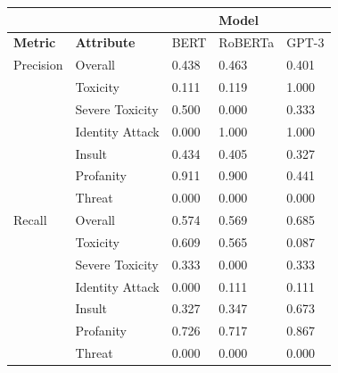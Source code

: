 \documentclass[11pt]{article}
\begin{document}
\begin{table}[h]
\centering
\begin{tabular}{lllll}
\hline
                                     &                                        &       & \textbf{Model}   &       \\ \hline
\multicolumn{1}{l|}{\textbf{Metric}} & \multicolumn{1}{l|}{\textbf{Attribute}} & BERT  & RoBERTa & GPT-3 \\ \hline
\multicolumn{1}{l|}{Precision}       & \multicolumn{1}{l|}{Overall}           & 0.438 & 0.463   & 0.401 \\ \cline{2-5} 
\multicolumn{1}{l|}{}                & \multicolumn{1}{l|}{Toxicity}          & 0.111 & 0.119   & 1.000 \\ \cline{2-5} 
\multicolumn{1}{l|}{}                & \multicolumn{1}{l|}{Severe Toxicity}   & 0.500 & 0.000   & 0.333 \\ \cline{2-5} 
\multicolumn{1}{l|}{}                & \multicolumn{1}{l|}{Identity Attack}   & 0.000 & 1.000   & 1.000 \\ \cline{2-5} 
\multicolumn{1}{l|}{}                & \multicolumn{1}{l|}{Insult}            & 0.434 & 0.405   & 0.327 \\ \cline{2-5} 
\multicolumn{1}{l|}{}                & \multicolumn{1}{l|}{Profanity}         & 0.911 & 0.900   & 0.441 \\ \cline{2-5} 
\multicolumn{1}{l|}{}                & \multicolumn{1}{l|}{Threat}            & 0.000 & 0.000   & 0.000 \\ \hline
\multicolumn{1}{l|}{Recall}          & \multicolumn{1}{l|}{Overall}           & 0.574 & 0.569   & 0.685 \\ \cline{2-5} 
\multicolumn{1}{l|}{}                & \multicolumn{1}{l|}{Toxicity}          & 0.609 & 0.565   & 0.087 \\ \cline{2-5} 
\multicolumn{1}{l|}{}                & \multicolumn{1}{l|}{Severe Toxicity}   & 0.333 & 0.000   & 0.333 \\ \cline{2-5} 
\multicolumn{1}{l|}{}                & \multicolumn{1}{l|}{Identity Attack}   & 0.000 & 0.111   & 0.111 \\ \cline{2-5} 
\multicolumn{1}{l|}{}                & \multicolumn{1}{l|}{Insult}            & 0.327 & 0.347   & 0.673 \\ \cline{2-5} 
\multicolumn{1}{l|}{}                & \multicolumn{1}{l|}{Profanity}         & 0.726 & 0.717   & 0.867 \\ \cline{2-5} 
\multicolumn{1}{l|}{}                & \multicolumn{1}{l|}{Threat}            & 0.000 & 0.000   & 0.000 \\ \hline

\end{tabular}
\end{table}
\end{document}
